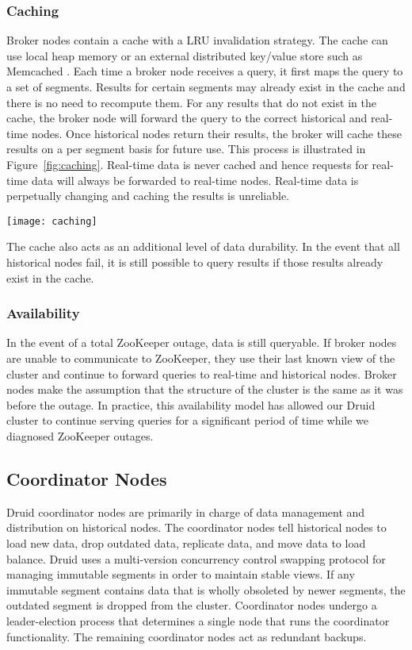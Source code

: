 \documentclass{sig-alternate-2013}
\begin{document}
\subsubsection{Caching}
\label{sec:caching}
Broker nodes contain a cache with a LRU \cite{o1993lru, kim2001lrfu}
invalidation strategy. The cache can use local heap memory or an external
distributed key/value store such as Memcached
\cite{fitzpatrick2004distributed}. Each time a broker node receives a query, it
first maps the query to a set of segments. Results for certain segments may
already exist in the cache and there is no need to recompute them. For any
results that do not exist in the cache, the broker node will forward the query
to the correct historical and real-time nodes. Once historical nodes return
their results, the broker will cache these results on a per segment basis for
future use. This process is illustrated in Figure~\ref{fig:caching}. Real-time
data is never cached and hence requests for real-time data will always be
forwarded to real-time nodes. Real-time data is perpetually changing and
caching the results is unreliable.

\begin{figure*}
\centering
\texttt{[image: caching]}
\caption{Results are cached per segment. Queries combine cached results with results computed on historical and real-time nodes.}
\label{fig:caching}
\end{figure*}

The cache also acts as an additional level of data durability. In the event
that all historical nodes fail, it is still possible to query results if those
results already exist in the cache.

\subsubsection{Availability}
In the event of a total ZooKeeper outage, data is still queryable. If broker
nodes are unable to communicate to ZooKeeper, they use their last known view of
the cluster and continue to forward queries to real-time and historical nodes.
Broker nodes make the assumption that the structure of the cluster is the same
as it was before the outage. In practice, this availability model has allowed
our Druid cluster to continue serving queries for a significant period of time while we
diagnosed ZooKeeper outages.

\subsection{Coordinator Nodes}
Druid coordinator nodes are primarily in charge of data management and
distribution on historical nodes. The coordinator nodes tell historical nodes
to load new data, drop outdated data, replicate data, and move data to load
balance. Druid uses a multi-version concurrency control swapping protocol for
managing immutable segments in order to maintain stable views. If any
immutable segment contains data that is wholly obsoleted by newer segments, the
outdated segment is dropped from the cluster. Coordinator nodes undergo a
leader-election process that determines a single node that runs the coordinator
functionality. The remaining coordinator nodes act as redundant backups.
\end{document}
